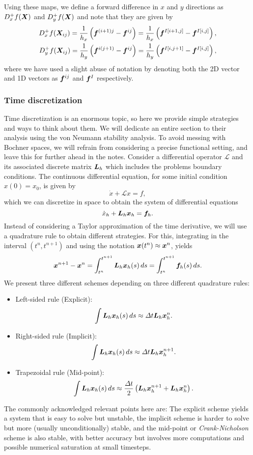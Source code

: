 \documentclass{article}
\renewcommand{\vec}{\vectorsym}
\newcommand{\mat}{\matrixsym}
\begin{document}
Using these maps, we define a forward difference in $x$ and $y$ directions as $D^+_xf(\vec X)$ and $D^+_yf(\vec X)$ and note that they are given by
    \begin{align*}
        D^+_x f(\vec X_{ij}) = \frac 1{h_x} \left(\vec f^{(i+1)j} - \vec f^{ij}\right)= \frac 1 {h_x} \left( \vec f^{I[i+1,j]} - \vec f^{I[i,j]}\right), \\
        D^+_y f(\vec X_{ij}) = \frac 1{h_y} \left(\vec f^{i(j+1)} - \vec f^{ij}\right) = \frac 1{h_y} \left(\vec f^{I[i,j+1]} - \vec f^{I[i,j]}\right),
    \end{align*}
    where we have used a slight abuse of notation by denoting both the 2D vector and 1D vectors as $\vec f^{ij}$ and $\vec f^I$ respectively. 
    
\subsubsection{Time discretization}
Time discretization is an enormous topic, so here we provide simple strategies and ways to think about them. We will dedicate an entire section to their analysis using the von Neumann stability analysis. To avoid messing with Bochner spaces, we will refrain from considering a precise functional setting, and leave this for further ahead in the notes. Consider a differential operator $\mathcal L$ and its associated discrete matrix $\mat L_h$ which includes the problems boundary conditions. The continuous differential equation, for some initial condition $x(0) = x_0$, is given by 
    $$ \dot x + \mathcal L x = f, $$
    which we can discretize in space to obtain the system of differential equations
    $$ \dot x_h + \mat L_h \vec x_h = \vec f_h. $$
    Instead of considering a Taylor approximation of the time derivative, we will use a quadrature rule to obtain different strategies. For this, integrating in the interval $(t^n, t^{n+1})$ and using the notation $\vec x(t^n) \approx \vec x^{n}$, yields
    $$ \vec x^{n+1} - \vec x^n = \int_{t^n}^{t^{n+1}} \mat L_h \vec x_h(s) \,ds = \int_{t^n}^{t^{n+1}} \vec f_h(s)\,ds. $$
    We present three different schemes depending on three different quadrature rules: 
    \begin{itemize}
        \item Left-sided rule (Explicit):
                $$ \int \mat L_h \vec x_h(s)\,ds \approx \Delta t \mat L_h\vec x_h^n. $$
        \item  Right-sided rule (Implicit): 
            $$ \int \mat L_h \vec x_h(s)\,ds \approx \Delta t\mat L_h\vec x_h^{n+1}. $$
        \item  Trapezoidal rule (Mid-point): 
            $$ \int \mat L_h \vec x_h(s)\,ds \approx \frac{\Delta t}{2}\left(\mat L_h\vec x_h^{n+1}+ \mat L_h \vec x_h^n\right). $$
    \end{itemize}
    The commonly acknowledged relevant points here are: The explicit scheme yields a system that is easy to solve but unstable, the implicit scheme is harder to solve but more (usually unconditionally) stable, and the mid-point or \emph{Crank-Nicholson} scheme is also stable, with better accuracy but involves more computations and possible numerical saturation at small timesteps. 
\end{document}
